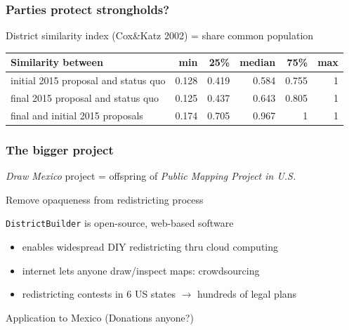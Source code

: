 \documentclass[xcolor=dvipsnames]{beamer}  %
\begin{document}
\begin{frame}
    \frametitle{Parties protect strongholds?}

District similarity index (Cox\&Katz 2002) = share common population

\bigskip

\begin{center}
\begin{footnotesize}
  \begin{tabular}{lrrrrr}
  Similarity between                   &   min  &  25\%  & median &  75\% &  max \\ \hline
  initial 2015 proposal and status quo & 0.128  & 0.419  & 0.584  & 0.755 &  1   \\
  final 2015 proposal and status quo   & 0.125  & 0.437  & 0.643  & 0.805 &  1   \\
  final and initial 2015 proposals     & 0.174  & 0.705  & 0.967  & 1     &  1   \\
  \end{tabular}
\end{footnotesize}
\end{center}
\end{frame}
\begin{frame}\label{fr:MxMapProj}                      %

    \frametitle{The bigger project}

\emph{Draw Mexico} project = offspring of \emph{Public Mapping Project in U.S.}

\bigskip

Remove opaqueness from redistricting process 

\bigskip

\texttt{DistrictBuilder} is open-source, web-based software %

\begin{itemize}

\item enables widespread DIY redistricting thru cloud computing

\item  internet lets anyone draw/inspect maps: crowdsourcing

\item redistricting contests in 6 US states $\rightarrow$ hundreds of legal plans

\end{itemize}

\bigskip

Application to \alert{Mexico} \href{http://23.21.151.172/}{} (Donations anyone?) 

\end{frame}
\end{document}
